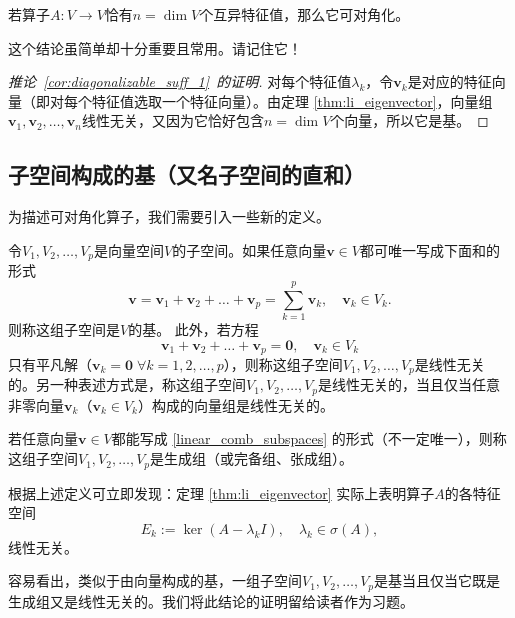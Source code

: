 \begin{corollary}\label{cor:diagonalizable_suff_1}
    若算子$A:V\to V$恰有$n=\dim V$个互异特征值，那么它可对角化。
\end{corollary}
这个结论虽简单却十分重要且常用。请记住它！
\begin{proof}[推论~\ref{cor:diagonalizable_suff_1}~的证明]
    对每个特征值$\lambda_k$，令$\mathbf{v}_k$是对应的特征向量（即对每个特征值选取一个特征向量）。由定理 \ref{thm:li_eigenvector}，向量组$\mathbf{v}_1,\mathbf{v}_2,\ldots,\mathbf{v}_{n}$线性无关，又因为它恰好包含$n=\dim V$个向量，所以它是基。
\end{proof}

\subsection{子空间构成的基（又名子空间的直和）}

为描述可对角化算子，我们需要引入一些新的定义。

令$V_1,V_2,\ldots,V_p$是向量空间$V$的子空间。如果任意向量$\mathbf{v}\in V$都可唯一写成下面和的形式
\begin{equation}\label{linear_comb_subspaces}
    \mathbf{v}=\mathbf{v}_1+\mathbf{v}_2+\ldots+\mathbf{v}_p=\sum_{k=1}^p\mathbf{v}_k,\quad\mathbf{v}_k\in V_k.
\end{equation}
则称这组子空间是$V$的基。
此外，若方程\[\mathbf{v}_1+\mathbf{v}_2+\ldots+\mathbf{v}_p=\mathbf{0},\quad\mathbf{v}_k\in V_k\]
只有平凡解（$\mathbf{v}_{k}=\mathbf{0}\; \forall k=1,2,\ldots,p$），则称这组子空间$V_1,V_2,\ldots,V_p$是线性无关的。另一种表述方式是，称这组子空间$V_1,V_2,\ldots,V_p$是线性无关的，当且仅当任意非零向量$\mathbf{v}_k$（$\mathbf{v}_k\in V_k$）构成的向量组是线性无关的。

若任意向量$\mathbf{v}\in V$都能写成 \eqref{linear_comb_subspaces} 的形式（不一定唯一），则称这组子空间$V_1,V_2,\ldots,V_p$是生成组（或完备组、张成组）。

\begin{remark}\label{remark:eigenspace_li}
    根据上述定义可立即发现：定理 \ref{thm:li_eigenvector} 实际上表明算子$A$的各特征空间
    \[E_k:=\ker (A-\lambda_kI),\quad\lambda_k\in\sigma(A),\]
    线性无关。
\end{remark}
\begin{remark}
    容易看出，类似于由向量构成的基，一组子空间$V_1,V_2,\ldots,V_p$是基当且仅当它既是生成组又是线性无关的。我们将此结论的证明留给读者作为习题。
\end{remark}

